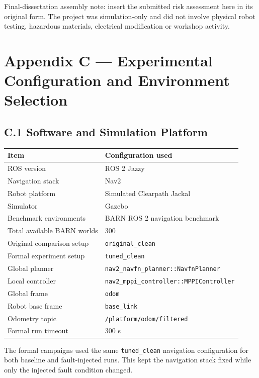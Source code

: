 Final-dissertation assembly note: insert the submitted risk assessment here in its original form. The project was simulation-only and did not involve physical robot testing, hazardous materials, electrical modification or workshop activity.

\hypertarget{appendix-c-experimental-configuration-and-environment-selection}{%
\section{Appendix C --- Experimental Configuration and Environment Selection}\label{appendix-c-experimental-configuration-and-environment-selection}}

\hypertarget{c.1-software-and-simulation-platform}{%
\subsection{C.1 Software and Simulation Platform}\label{c.1-software-and-simulation-platform}}

\begin{longtable}[]{@{}ll@{}}
\toprule\noalign{}
Item & Configuration used \\
\midrule\noalign{}
\endhead
\bottomrule\noalign{}
\endlastfoot
ROS version & ROS 2 Jazzy \\
Navigation stack & Nav2 \\
Robot platform & Simulated Clearpath Jackal \\
Simulator & Gazebo \\
Benchmark environments & BARN ROS 2 navigation benchmark \\
Total available BARN worlds & 300 \\
Original comparison setup & \texttt{original\_clean} \\
Formal experiment setup & \texttt{tuned\_clean} \\
Global planner & \texttt{nav2\_navfn\_planner::NavfnPlanner} \\
Local controller & \texttt{nav2\_mppi\_controller::MPPIController} \\
Global frame & \texttt{odom} \\
Robot base frame & \texttt{base\_link} \\
Odometry topic & \texttt{/platform/odom/filtered} \\
Formal run timeout & 300 s \\
\end{longtable}

The formal campaigns used the same \texttt{tuned\_clean} navigation configuration for both baseline and fault-injected runs. This kept the navigation stack fixed while only the injected fault condition changed.

